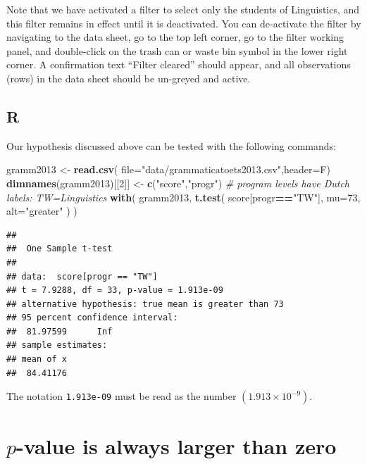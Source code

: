 \documentclass[
]{book}
\newenvironment{Shaded}{\begin{snugshade}}{\end{snugshade}}
\newcommand{\AttributeTok}[1]{\textcolor[rgb]{0.13,0.29,0.53}{#1}}
\newcommand{\CommentTok}[1]{\textcolor[rgb]{0.56,0.35,0.01}{\textit{#1}}}
\newcommand{\DecValTok}[1]{\textcolor[rgb]{0.00,0.00,0.81}{#1}}
\newcommand{\FunctionTok}[1]{\textcolor[rgb]{0.13,0.29,0.53}{\textbf{#1}}}
\newcommand{\NormalTok}[1]{#1}
\newcommand{\OtherTok}[1]{\textcolor[rgb]{0.56,0.35,0.01}{#1}}
\newcommand{\SpecialCharTok}[1]{\textcolor[rgb]{0.81,0.36,0.00}{\textbf{#1}}}
\newcommand{\StringTok}[1]{\textcolor[rgb]{0.31,0.60,0.02}{#1}}
\begin{document}
Note that we have activated a filter to select only the students of Linguistics, and this filter remains in effect until it is deactivated. You can de-activate the filter by navigating to the data sheet, go to the top left corner, go to the filter working panel, and double-click on the trash can or waste bin symbol in the lower right corner. A confirmation text ``Filter cleared'' should appear, and all observations (rows) in the data sheet should be un-greyed and active.

\subsection{R}\label{r-12}

Our hypothesis discussed above can be tested with the following commands:

\begin{Shaded}
\begin{Highlighting}[]
\NormalTok{gramm2013 }\OtherTok{\textless{}{-}} \FunctionTok{read.csv}\NormalTok{( }\AttributeTok{file=}\StringTok{"data/grammaticatoets2013.csv"}\NormalTok{,}\AttributeTok{header=}\NormalTok{F)}
\FunctionTok{dimnames}\NormalTok{(gramm2013)[[}\DecValTok{2}\NormalTok{]] }\OtherTok{\textless{}{-}} \FunctionTok{c}\NormalTok{(}\StringTok{"score"}\NormalTok{,}\StringTok{"progr"}\NormalTok{)}
\CommentTok{\# program levels have Dutch labels: TW=Linguistics}
\FunctionTok{with}\NormalTok{( gramm2013,}
      \FunctionTok{t.test}\NormalTok{( score[progr}\SpecialCharTok{==}\StringTok{"TW"}\NormalTok{], }\AttributeTok{mu=}\DecValTok{73}\NormalTok{, }\AttributeTok{alt=}\StringTok{"greater"}\NormalTok{ ) )}
\end{Highlighting}
\end{Shaded}

\begin{verbatim}
## 
##  One Sample t-test
## 
## data:  score[progr == "TW"]
## t = 7.9288, df = 33, p-value = 1.913e-09
## alternative hypothesis: true mean is greater than 73
## 95 percent confidence interval:
##  81.97599      Inf
## sample estimates:
## mean of x 
##  84.41176
\end{verbatim}

The notation \texttt{1.913e-09} must be read as the number
\((1.913 \times 10^{-9})\).

\section{\texorpdfstring{\(p\)-value is always larger than zero}{p-value is always larger than zero}}\label{sec:plargerthannull}
\end{document}
